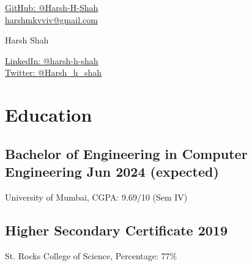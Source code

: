 \documentclass[a4,10pt]{article}
\begin{document}
\begin{center}
    \begin{minipage}[b]{0.24\textwidth}
    \large  %
            {\href{https://www.github.com/harsh-h-shah/}{
            \color{UI_blue} GitHub: @Harsh-H-Shah} } \\
            \large \href{mailto:harshmkvviv@gmail.com}{
            \color{UI_blue} harshmkvviv@gmail.com} 
    \end{minipage}%
    \begin{minipage}[b]{0.5\textwidth}
            \centering
            {\Huge Harsh Shah} \\ %
            \vspace{0.1cm}
    \end{minipage}%
    \begin{minipage}[b]{0.24\textwidth}
            \flushright \large  %
            {\href{https://www.linkedin.com/in/harsh-h-shah/}{
            \color{UI_blue} LinkedIn: @harsh-h-shah} } \\
            \href{https://twitter.com/Harsh_h_shah}{
            \color{UI_blue} Twitter: @Harsh\_h\_shah}
    \end{minipage}   
    
\vspace{-0.3cm} 
\end{center}


\section{Education}
\vspace{-0.1cm}
\subsection*{Bachelor of Engineering in Computer Engineering \hfill Jun 2024 (expected)}{\normalsize \normalfont University of Mumbai, CGPA: 9.69/10 (Sem IV)}
\vspace{-0.4cm}
\subsection*{Higher Secondary Certificate \hfill 2019} {\normalsize \normalfont St. Rocks College of Science, Percentage: 77\%}
\vspace{-0.4cm}
\end{document}
